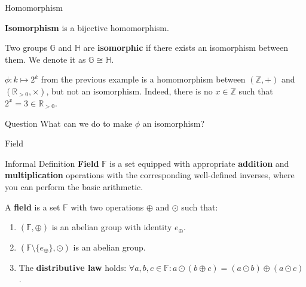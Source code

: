 \documentclass{zkdl-presentation-template}
\begin{document}
  \begin{frame}{Homomorphism}
    \begin{definition}
      \textbf{Isomorphism} is a bijective homomorphism.\pause
    \end{definition}

    \begin{definition}
      Two groups $\mathbb{G}$ and $\mathbb{H}$ are \textbf{isomorphic} if there exists an isomorphism between them. We denote it as $\mathbb{G} \cong \mathbb{H}$.\pause
    \end{definition}

    \begin{example}
     $\phi: k \mapsto 2^k$ from the previous example is a homomorphism between $(\mathbb{Z},+)$ and $(\mathbb{R}_{>0},\times)$, but not an isomorphism. Indeed, there is no $x \in \mathbb{Z}$ such that $2^x = 3 \in \mathbb{R}_{>0}$.\pause
    \end{example}

    \begin{questionblock}{Question}
      What can we do to make $\phi$ an isomorphism?
     \end{questionblock}
  \end{frame}

  \begin{frame}{Field}
    \begin{block}{Informal Definition}
        \textbf{Field} $\mathbb{F}$ is a set equipped with appropriate \textbf{addition} and \textbf{multiplication} operations with the corresponding well-defined inverses, where you can perform the basic arithmetic.\pause
    \end{block}
    
      \begin{definition}
        A \textbf{field} is a set $\mathbb{F}$ with two operations $\oplus$ and $\odot$ such that:
        \begin{enumerate}
            \item $(\mathbb{F}, \oplus)$ is an abelian group with identity $e_{\oplus}$.
            \item $(\mathbb{F} \setminus \{e_{\oplus}\}, \odot)$ is an abelian group.
            \item The \textbf{distributive law} holds: $\forall a,b,c \in \mathbb{F}: a \odot (b \oplus c) = (a \odot b) \oplus (a \odot c)$.
        \end{enumerate}
      \end{definition}
    \end{frame}
\end{document}
